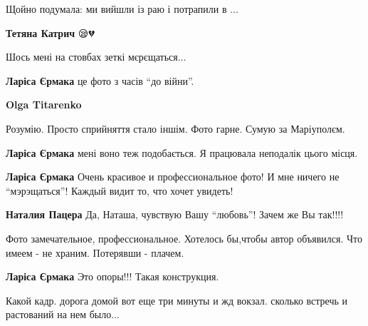  
 
 
 
 

\qqSecCmt


Щойно подумала: ми вийшли із раю і потрапили в ...

\begin{itemize} %
\textbf{Тетяна Катрич} 😪💔
\end{itemize} %


Шось мені на стовбах зеткі мєрєщаться...

\begin{itemize} %
\textbf{Ларіса Єрмака} це фото з часів \enquote{до війни}.

\textbf{Olga Titarenko}

Розумію. Просто сприйняття стало іншім. Фото гарне.
Сумую за Маріуполєм.

\textbf{Ларіса Єрмака} мені воно теж подобається. Я працювала неподалік цього місця.

\textbf{Ларіса Єрмака} Очень красивое и профессиональное фото! И мне ничего не \enquote{мэрэщаться}! Каждый видит то, что хочет увидеть!

\textbf{Наталия Пацера} Да, Наташа, чувствую Вашу \enquote{любовь}! Зачем же Вы так!!!!


Фото замечательное, профессиональное. Хотелось бы,чтобы автор объявился. Что имеем - не храним. Потерявши - плачем.

\textbf{Ларіса Єрмака} Это опоры!!! Такая конструкция.

\end{itemize} %


Какой кадр. дорога домой вот еще три минуты и жд вокзал. сколько встречь и растований на нем было...


